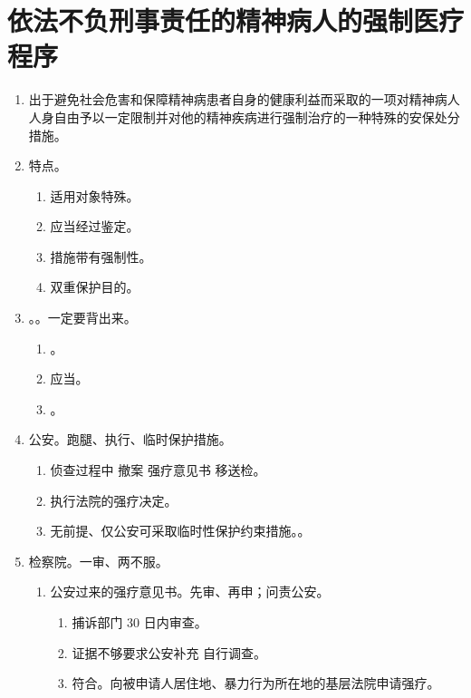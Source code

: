 \section{依法不负刑事责任的精神病人的强制医疗程序}
\begin{enumerate}
  \item 出于避免社会危害和保障精神病患者自身的健康利益而采取的一项对精神病人人身自由予以一定限制并对他的精神疾病进行强制治疗的一种特殊的安保处分措施。
  \item 特点。
        \begin{enumerate}
          \item 适用对象特殊。
          \item 应当经过鉴定。
          \item 措施带有强制性。
          \item 双重保护目的。
        \end{enumerate}
  \item {}。。一定要背出来。
        \begin{enumerate}
          \item {}。
          \item 应当。
          \item {}。
        \end{enumerate}
  \item 公安。跑腿、执行、临时保护措施。
        \begin{enumerate}
          \item 侦查过程中 \yjt 撤案 \yjt 强疗意见书 \yjt 移送检。
          \item 执行法院的强疗决定。
          \item 无前提、仅公安可采取临时性保护约束措施。。
        \end{enumerate}
  \item 检察院。一审、两不服。
        \begin{enumerate}
          \item 公安过来的强疗意见书。先审、再申；问责公安。
                \begin{enumerate}
                  \item 捕诉部门 30 日内审查。
                  \item 证据不够要求公安补充 \hz 自行调查。
                  \item 符合。向被申请人居住地、暴力行为所在地的基层法院申请强疗。

\end{enumerate}
\end{enumerate}
\end{enumerate}
